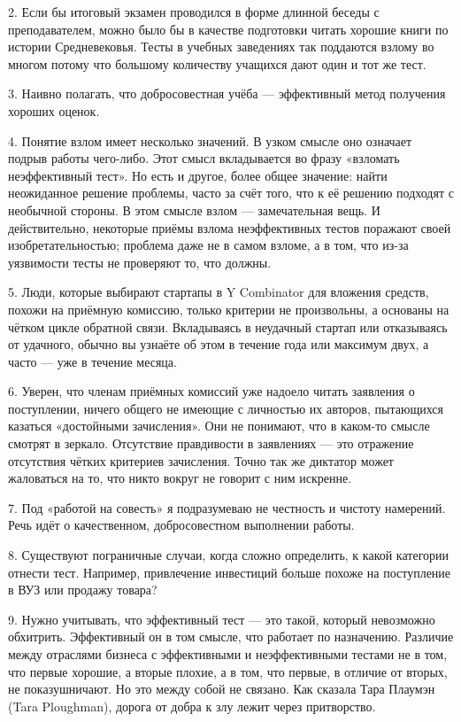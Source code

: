 \documentclass[ebook,12pt,oneside,openany]{memoir}
\begin{document}
2. Если бы итоговый экзамен проводился в форме длинной беседы с
преподавателем, можно было бы в качестве подготовки читать хорошие
книги по истории Средневековья. Тесты в учебных заведениях так
поддаются взлому во многом потому что большому количеству учащихся
дают один и тот же тест.

3. Наивно полагать, что добросовестная учёба — эффективный метод
получения хороших оценок.

4. Понятие взлом имеет несколько значений. В узком смысле оно означает
подрыв работы чего-либо. Этот смысл вкладывается во фразу «взломать
неэффективный тест». Но есть и другое, более общее значение: найти
неожиданное решение проблемы, часто за счёт того, что к её решению
подходят с необычной стороны. В этом смысле взлом — замечательная
вещь. И действительно, некоторые приёмы взлома неэффективных тестов
поражают своей изобретательностью; проблема даже не в самом взломе, а
в том, что из-за уязвимости тесты не проверяют то, что должны.

5. Люди, которые выбирают стартапы в Y Combinator для вложения
средств, похожи на приёмную комиссию, только критерии не произвольны,
а основаны на чётком цикле обратной связи. Вкладываясь в неудачный
стартап или отказываясь от удачного, обычно вы узнаёте об этом в
течение года или максимум двух, а часто — уже в течение месяца.

6. Уверен, что членам приёмных комиссий уже надоело читать заявления о
поступлении, ничего общего не имеющие с личностью их авторов,
пытающихся казаться «достойными зачисления». Они не понимают, что в
каком-то смысле смотрят в зеркало. Отсутствие правдивости в заявлениях
— это отражение отсутствия чётких критериев зачисления. Точно так же
диктатор может жаловаться на то, что никто вокруг не говорит с ним
искренне.

7. Под «работой на совесть» я подразумеваю не честность и чистоту
намерений. Речь идёт о качественном, добросовестном выполнении работы.

8. Существуют пограничные случаи, когда сложно определить, к какой
категории отнести тест. Например, привлечение инвестиций больше похоже
на поступление в ВУЗ или продажу товара?

9. Нужно учитывать, что эффективный тест — это такой, который
невозможно обхитрить. Эффективный он в том смысле, что работает по
назначению. Различие между отраслями бизнеса с эффективными и
неэффективными тестами не в том, что первые хорошие, а вторые плохие,
а в том, что первые, в отличие от вторых, не показушничают. Но это
между собой не связано. Как сказала Тара Плаумэн (Tara Ploughman),
дорога от добра к злу лежит через притворство.
\end{document}
